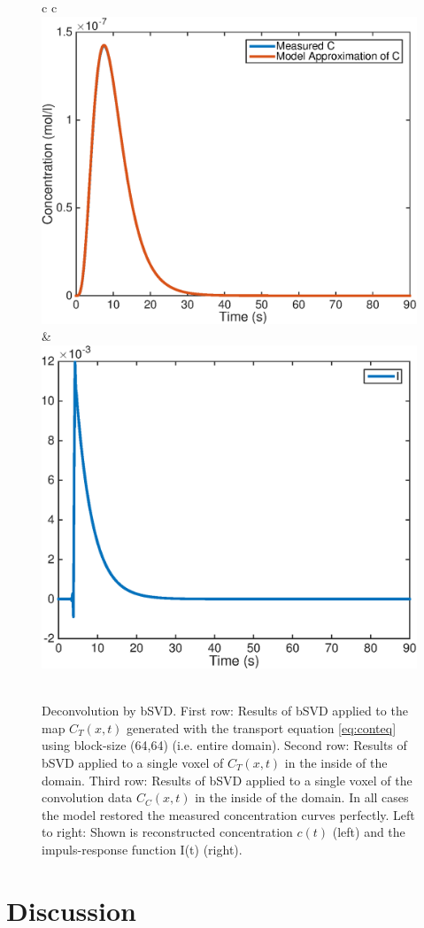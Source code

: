 \documentclass[paper=a4, fontsize=11pt,parskip=half,headings=small]{scrartcl}
\begin{document}
\begin{figure}[H]
\begin{tabular}{c c}
				  \\				 
				 \includegraphics[width = .45\textwidth]{./figs/C-and-Crec-conv.eps} & \includegraphics[width = .45\textwidth]{./figs/Irec-conv.eps} \\			 
				  \\				 				 
			\end{tabular}
		\caption{Deconvolution by bSVD. First row: Results of bSVD applied to the map $C_T(x,t)$ generated with the transport equation \eqref{eq:conteq} using block-size (64,64) (i.e. entire domain). Second row: Results of bSVD applied to a single voxel of $C_T(x,t)$ in the inside of the domain. Third row: Results of bSVD applied to a single voxel of the convolution data $C_C(x,t)$ in the inside of the domain. In all cases the model restored the measured concentration curves perfectly. Left to right: Shown is reconstructed concentration $c(t)$ (left) and the impuls-response function I(t) (right).}			
		\label{fig:deconvResults}
	\end{figure}

	
	
	\section{Discussion}\label{sec:conclusion}
	
\end{document}
